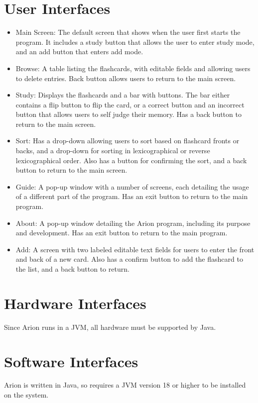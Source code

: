 \documentclass{scrreprt}
\begin{document}
\section{User Interfaces}
\begin{itemize}
    \item
        Main Screen: The default screen that shows when the user first starts the program.
        It includes a study button that allows the user to enter study mode,
        and an add button that enters add mode.
    \item 
        Browse: A table listing the flashcards, with editable fields and allowing users to 
        delete entries. Back button allows users to return to the main screen.
    \item
        Study: Displays the flashcards and a bar with buttons. The bar either contains a 
        flip button to flip the card, or a correct button and an incorrect button that
        allows users to self judge their memory. Has a back button to return to 
        the main screen.
    \item 
        Sort: Has a drop-down allowing users to sort based on flashcard fronts or backs,
        and a drop-down for sorting in lexicographical or reverse lexicographical order. 
        Also has a button for confirming the sort, and a back button to return to the main screen.
    \item 
        Guide: A pop-up window with a number of screens, each detailing the usage of a
        different part of the program. Has an exit button to return to the main program.
    \item 
        About: A pop-up window detailing the Arion program, including its purpose and development.
        Has an exit button to return to the main program.
    \item 
        Add: A screen with two labeled editable text fields for users to enter the front and
        back of a new card. Also has a confirm button to add the flashcard to the list, and
        a back button to return.
\end{itemize}

\section{Hardware Interfaces}
Since Arion runs in a JVM, all hardware must be supported by Java.

\section{Software Interfaces}
Arion is written in Java, so requires a JVM version 18 or higher to be installed on the system.
\end{document}
